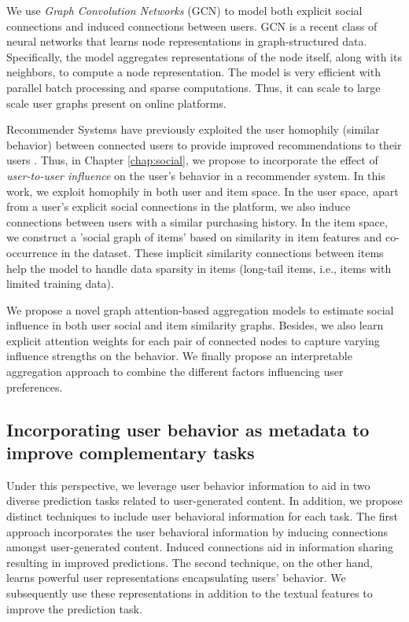 We use \emph{Graph Convolution Networks} (GCN) \cite{gcn} to model both explicit social connections and induced connections between users.
GCN is a recent class of neural networks that learns node representations in graph-structured data. Specifically, the model aggregates representations of the node itself, along with its neighbors, to compute a node representation. The model is very efficient with parallel batch processing and sparse computations. Thus, it can scale to large scale user graphs present on online platforms.

Recommender Systems have previously exploited the user homophily (similar behavior) between connected users to provide improved recommendations to their users \cite{Diffnet, SBPR, GRU4Rec}.
Thus, in Chapter \ref{chap:social}, we propose to incorporate the effect of \emph{user-to-user influence} on the user's behavior in a recommender system.
In this work,
we exploit homophily in both user and item space.
In the user space, apart from a user's explicit social connections in the platform, we also induce connections between users with a similar purchasing history.
In the item space, we construct a 'social graph of items' based on similarity in item features and co-occurrence in the dataset.
These implicit similarity connections between items help the model to handle data sparsity in items (long-tail items, i.e., items with limited training data).

We propose a novel graph attention-based aggregation models to estimate social influence in both user social and item similarity graphs. Besides, we also learn explicit attention weights for each pair of connected nodes to capture varying influence strengths on the behavior. We finally propose an interpretable aggregation approach to combine the different factors influencing user preferences.

\subsection{Incorporating user behavior as metadata to improve complementary tasks}
Under this perspective, we leverage user behavior information to aid in two diverse prediction tasks related to user-generated content. In addition, we propose distinct techniques to include user behavioral information for each task. The first approach incorporates the user behavioral information by inducing connections amongst user-generated content. Induced connections aid in information sharing resulting in improved predictions. The second technique, on the other hand, learns powerful user representations encapsulating users' behavior. We subsequently use these representations in addition to the textual features to improve the prediction task.

